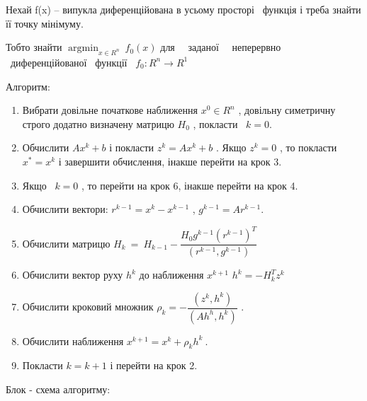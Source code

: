 \documentclass[12pt, letterpaper, twoside]{article}
\DeclareMathOperator*{\argmin}{argmin} %
\begin{document}
Нехай f(x) – випукла диференційована в усьому просторі \ функція і треба знайти її точку мінімуму.

Тобто знайти  $\displaystyle \argmin_{x\in R^{n}} \ f_{0}( x)$ для \ \ заданої \ \ неперервно \ диференційованої \ функції \ $\displaystyle f_{0} :R^{n}\rightarrow R^{1}$
\vspace{0.9cm}

Алгоритм:
\begin{enumerate}
	 \setlength\itemsep{0em}
	\item Вибрати довільне  початкове  наближення $\displaystyle x^{0} \in R^{n}$ , довільну симетричну  строго  додатно визначену  матрицю $\displaystyle H_{0}$ , покласти \ $\displaystyle k=0$.
	\item Обчислити $\displaystyle Ax^{k} +b$ і покласти  $\displaystyle z^{k} =Ax^{k} +b$ . Якщо $\displaystyle z^{k} =0$ , то покласти $\displaystyle x^{*} =x^{k}$ і  завершити обчислення, інакше перейти на крок 3.
	\item Якщо \ $\displaystyle k=0$ , то перейти на крок 6, інакше перейти на крок  4.
	\item Обчислити вектори: $\displaystyle r^{k-1} =x^{k} -x^{k-1}$ , $\displaystyle g^{k-1} =Ar^{k-1}$.
	\item Обчислити матрицю $\displaystyle H_{k} \ =\ H_{k-1} -\dfrac{H_{0} g^{k-1}\left( r^{k-1}\right)^{T}}{\left( r^{k-1} ,g^{k-1}\right)}$
	\item Обчислити  вектор  руху $\displaystyle h^{k}$ до наближення $\displaystyle x^{k+1}$ $\displaystyle h^{k} =-H^{T}_{k} z^{k}$
	\item Обчислити  кроковий  множник $\displaystyle \rho _{k} =-\dfrac{\left( z^{k} ,h^{k}\right)}{\left( Ah^{h} ,h^{k}\right)}$ .
	\item Обчислити наближення $\displaystyle x^{k+1} =x^{k} +\rho _{k} h^{k} \ .$
	\item  Покласти  $\displaystyle k=k+1$ і  перейти на  крок 2.
\end{enumerate}
\clearpage
Блок - схема алгоритму:\\
\end{document}
